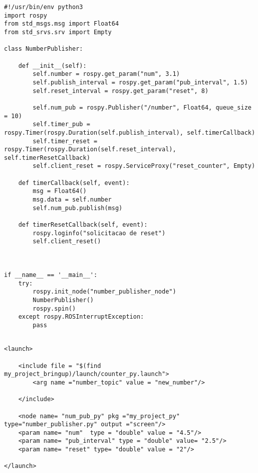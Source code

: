 \documentclass[letterpaper]{article}
\begin{document}
\begin{lstlisting}[style=pythonstyle, title=number\_publisher.py]
#!/usr/bin/env python3
import rospy
from std_msgs.msg import Float64
from std_srvs.srv import Empty

class NumberPublisher:         	            

    def __init__(self):
        self.number = rospy.get_param("num", 3.1)
        self.publish_interval = rospy.get_param("pub_interval", 1.5)
        self.reset_interval = rospy.get_param("reset", 8)

        self.num_pub = rospy.Publisher("/number", Float64, queue_size = 10)
        self.timer_pub = rospy.Timer(rospy.Duration(self.publish_interval), self.timerCallback)
        self.timer_reset = rospy.Timer(rospy.Duration(self.reset_interval), self.timerResetCallback)
        self.client_reset = rospy.ServiceProxy("reset_counter", Empty) 

    def timerCallback(self, event):
        msg = Float64()
        msg.data = self.number
        self.num_pub.publish(msg)
        
    def timerResetCallback(self, event):
        rospy.loginfo("solicitacao de reset")
        self.client_reset()
    


if __name__ == '__main__':
    try:
        rospy.init_node("number_publisher_node")	       
        NumberPublisher()
        rospy.spin()
    except rospy.ROSInterruptException:
        pass


\end{lstlisting}

\begin{lstlisting}[style=xmlstyle, title=my\_project\_py.launch]
<launch>
    
    <include file = "$(find my_project_bringup)/launch/counter_py.launch">
        <arg name ="number_topic" value = "new_number"/>
        
    </include>

    <node name= "num_pub_py" pkg ="my_project_py" type="number_publisher.py" output ="screen"/>
    <param name= "num"  type = "double" value = "4.5"/>
    <param name= "pub_interval" type = "double" value= "2.5"/>
    <param name= "reset" type= "double" value = "2"/>

</launch>
\end{lstlisting}
\end{document}
